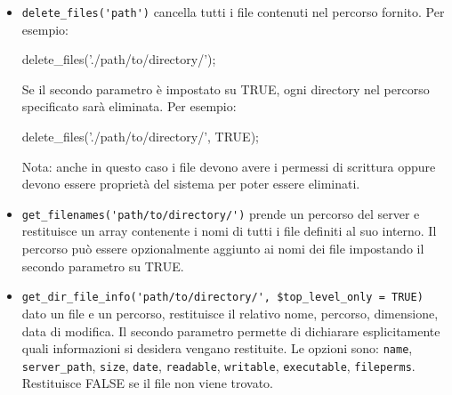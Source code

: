 \begin{itemize}
La modalità predefinita è . \'E consigliato consultare la guida PHP per le altre opzioni: \url{http://php.net/fopen}

Nota: Per utilizzare questa funzione i permessi dei file devono essere impostati per la scrittura (666, 777, ecc.) Se il file non esiste già, anche la directory che lo contiene deve avere i permessi di scrittura.

Nota: il percorso è relativo rispetto al file  nella directory root e non rispetto ai Controller o alle Viste. CodeIgniter usa un front controller, quindi i percorsi sono sempre relativi rispetto all'index principale.

\item \verb|delete_files('path')| cancella tutti i file contenuti nel percorso fornito. Per esempio:

\begin{code}
delete_files('./path/to/directory/');
\end{code}

Se il secondo parametro è impostato su TRUE, ogni directory nel percorso specificato sarà eliminata. Per esempio:

\begin{code}
delete_files('./path/to/directory/', TRUE);
\end{code}

Nota: anche in questo caso i file devono avere i permessi di scrittura oppure devono essere proprietà del sistema per poter essere eliminati.

\item \verb|get_filenames('path/to/directory/')| prende un percorso del server e restituisce un array contenente i nomi di tutti i file definiti al suo interno. Il percorso può essere opzionalmente aggiunto ai nomi dei file impostando il secondo parametro su TRUE.

\item \verb|get_dir_file_info('path/to/directory/', $top_level_only = TRUE)| dato un file e un percorso, restituisce il relativo nome, percorso, dimensione, data di modifica. Il secondo parametro permette di dichiarare esplicitamente quali informazioni si desidera vengano restituite. Le opzioni sono: \verb|name|, \verb|server_path|, \verb|size|, \verb|date|, \verb|readable|, \verb|writable|, \verb|executable|, \verb|fileperms|. Restituisce FALSE se il file non viene trovato.



\end{itemize}
